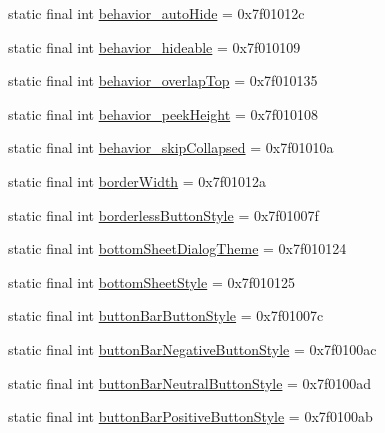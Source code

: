 \begin{CompactItemize}
static final int \hyperlink{classandroid_1_1support_1_1v7_1_1mediarouter_1_1_r_1_1attr_9c859fd8969843ce451a62e6d5ae5799}{behavior\_\-autoHide} = 0x7f01012c
\item 
static final int \hyperlink{classandroid_1_1support_1_1v7_1_1mediarouter_1_1_r_1_1attr_ddb23391027462a840c8037a491ac14e}{behavior\_\-hideable} = 0x7f010109
\item 
static final int \hyperlink{classandroid_1_1support_1_1v7_1_1mediarouter_1_1_r_1_1attr_a1a659c46861326ff6de222be0139779}{behavior\_\-overlapTop} = 0x7f010135
\item 
static final int \hyperlink{classandroid_1_1support_1_1v7_1_1mediarouter_1_1_r_1_1attr_a735fdbbee8804084e284dd47ac5e59d}{behavior\_\-peekHeight} = 0x7f010108
\item 
static final int \hyperlink{classandroid_1_1support_1_1v7_1_1mediarouter_1_1_r_1_1attr_e90cd962a016b59e85ddba02e2896f39}{behavior\_\-skipCollapsed} = 0x7f01010a
\item 
static final int \hyperlink{classandroid_1_1support_1_1v7_1_1mediarouter_1_1_r_1_1attr_06230d0b3bf879d3f58c157184148e05}{borderWidth} = 0x7f01012a
\item 
static final int \hyperlink{classandroid_1_1support_1_1v7_1_1mediarouter_1_1_r_1_1attr_28faac7fd4f62f4471f4c23ed610772c}{borderlessButtonStyle} = 0x7f01007f
\item 
static final int \hyperlink{classandroid_1_1support_1_1v7_1_1mediarouter_1_1_r_1_1attr_8812d264bf936bb6a065d88f6049ef86}{bottomSheetDialogTheme} = 0x7f010124
\item 
static final int \hyperlink{classandroid_1_1support_1_1v7_1_1mediarouter_1_1_r_1_1attr_c86e91bca095e7db82b2ed707ea0d61a}{bottomSheetStyle} = 0x7f010125
\item 
static final int \hyperlink{classandroid_1_1support_1_1v7_1_1mediarouter_1_1_r_1_1attr_a13c444edd871d88964bb4a4b0e117fd}{buttonBarButtonStyle} = 0x7f01007c
\item 
static final int \hyperlink{classandroid_1_1support_1_1v7_1_1mediarouter_1_1_r_1_1attr_6efe909fb8c6b26f612f3303b57e2279}{buttonBarNegativeButtonStyle} = 0x7f0100ac
\item 
static final int \hyperlink{classandroid_1_1support_1_1v7_1_1mediarouter_1_1_r_1_1attr_4b77c4c1dbc5c889e9c03239c5bac3b5}{buttonBarNeutralButtonStyle} = 0x7f0100ad
\item 
static final int \hyperlink{classandroid_1_1support_1_1v7_1_1mediarouter_1_1_r_1_1attr_ed6e2f26fd61d6eab7cf50536ebf42f7}{buttonBarPositiveButtonStyle} = 0x7f0100ab

\end{CompactItemize}
